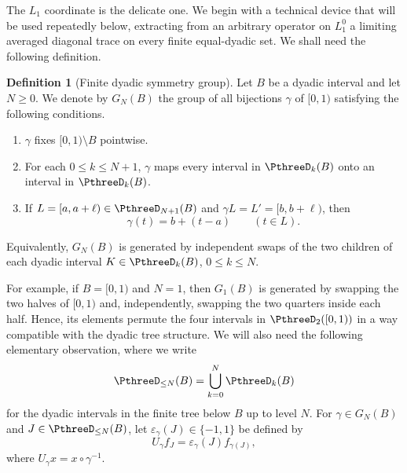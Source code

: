 \documentclass[11pt,reqno]{amsart}
\makeatletter
\theoremstyle{plain}
\theoremstyle{definition}
\newtheorem{definition}[definition]{Definition}
\newcounter{problempaper}
\newenvironment{problempaperbody}{%
  \setcounter{subsection}{0}%
  \setcounter{subsubsection}{0}%
  \setcounter{paragraph}{0}%
  \renewcommand{\thesubsection}{\arabic{subsection}}%
  \renewcommand{\thesubsubsection}{\thesubsection.\arabic{subsubsection}}%
  \renewcommand{\theparagraph}{\thesubsubsection.\arabic{paragraph}}%
  \let\problem@outersection\section
  \let\problem@outersubsection\subsection
  \let\problem@outersubsubsection\subsubsection
  \let\problem@outerparagraph\paragraph
  \let\section\problem@papersection
  \let\subsection\problem@papersubsection
  \let\subsubsection\problem@papersubsubsection
}{%
  \let\section\problem@outersection
  \let\subsection\problem@outersubsection
  \let\subsubsection\problem@outersubsubsection
  \let\paragraph\problem@outerparagraph
}
\newcommand{\problem@target}[2]{%
  \hypertarget{problem-\theproblempaper-#1-#2}{}%
}
\newcommand{\problem@paperheading}[3]{%
  \par\bigskip
  \problem@target{#1}{#2}%
  \noindent{\large\bfseries #2.\quad #3\par}%
  \nobreak\smallskip
}
\newcommand{\problem@papersubheading}[3]{%
  \par\medskip
  \problem@target{#1}{#2}%
  \noindent{\normalsize\bfseries #2.\quad #3\par}%
  \nobreak\smallskip
}
\newcommand{\problem@papersubsubheading}[3]{%
  \par\smallskip
  \problem@target{#1}{#2}%
  \noindent{\normalsize\itshape #2.\quad #3.\ }%
}
\def\problem@papersection{%
  \@ifstar{\problem@papersectionstar}{\problem@papersectionnostar}%
}
\def\problem@papersectionstar#1{%
  \par\bigskip\noindent{\large\bfseries #1\par}\nobreak\smallskip
}
\def\problem@papersectionnostar#1{%
  \refstepcounter{subsection}%
  \setcounter{subsubsection}{0}%
  \setcounter{paragraph}{0}%
  \problem@paperheading{section}{\thesubsection}{#1}%
  \problem@writecontentsline{section}{\thesubsection}{#1}%
}
\def\problem@papersubsection{%
  \@ifstar{\problem@papersubsectionstar}{\problem@papersubsectionnostar}%
}
\def\problem@papersubsectionstar#1{%
  \par\medskip\noindent{\normalsize\bfseries #1\par}\nobreak\smallskip
}
\def\problem@papersubsectionnostar#1{%
  \refstepcounter{subsubsection}%
  \setcounter{paragraph}{0}%
  \problem@papersubheading{subsection}{\thesubsubsection}{#1}%
  \problem@writecontentsline{subsection}{\thesubsubsection}{#1}%
}
\def\problem@papersubsubsection{%
  \@ifstar{\problem@papersubsubsectionstar}{\problem@papersubsubsectionnostar}%
}
\def\problem@papersubsubsectionstar#1{%
  \par\smallskip\noindent{\normalsize\itshape #1.\ }%
}
\def\problem@papersubsubsectionnostar#1{%
  \refstepcounter{paragraph}%
  \problem@papersubsubheading{subsubsection}{\theparagraph}{#1}%
  \problem@writecontentsline{subsubsection}{\theparagraph}{#1}%
}
\newcommand{\problem@writecontentsline}[3]{%
  \begingroup
  \protected@write\@auxout{}{%
    \string\problemcontentsentry{\theproblempaper}{#1}{#2}{#3}{\thepage}%
  }%
  \endgroup
}
\newcommand{\problemcontentsentry}[5]{%
  \@ifundefined{problemcontents@#1}{%
    \expandafter\gdef\csname problemcontents@#1\endcsname{}%
  }{}%
  \expandafter\g@addto@macro\csname problemcontents@#1\endcsname{%
    \problemcontentsline{#1}{#2}{#3}{#4}{#5}%
  }%
}
\newcommand{\problemcontentslink}[4]{%
  \hyperlink{problem-#1-#2-#3}{#4}%
}
\newcommand{\problemcontentsline}[5]{%
  \ifstrequal{#2}{section}{%
    \par\noindent
    \problemcontentslink{#1}{#2}{#3}{\makebox[2.5em][l]{#3}#4}%
    \nobreak\dotfill
    \problemcontentslink{#1}{#2}{#3}{#5}\par
  }{%
    \ifstrequal{#2}{subsection}{%
      \par\noindent\hspace*{1.5em}%
      \problemcontentslink{#1}{#2}{#3}{\makebox[3.5em][l]{#3}#4}%
      \nobreak\dotfill
      \problemcontentslink{#1}{#2}{#3}{#5}\par
    }{%
      \par\noindent\hspace*{3em}%
      \problemcontentslink{#1}{#2}{#3}{\makebox[4.5em][l]{#3}#4}%
      \nobreak\dotfill
      \problemcontentslink{#1}{#2}{#3}{#5}\par
    }%
  }%
}
\makeatother
\begin{document}
\begin{problempaperbody}
The $L_1$ coordinate is the delicate one. We begin with a technical device that will be used repeatedly below, extracting from an arbitrary operator on $L_1^0$ a limiting averaged diagonal trace on every finite equal-dyadic set. We shall need the following definition.

\begin{definition}[Finite dyadic symmetry group]\label{p3:def:finite-dyadic-symmetry-group}
    Let $B$ be a dyadic interval and let $N\geq 0$. We denote by $G_N(B)$ the group of all bijections $\gamma$ of $[0,1)$ satisfying the following conditions.
    \begin{enumerate}[label=\textup{(\roman*)}]
        \item \label{p3:item:dyadic-symmetry-outside} $\gamma$ fixes $[0,1)\setminus B$ pointwise.
        \item \label{p3:item:dyadic-symmetry-levels} For each $0\leq k\leq N+1$, $\gamma$ maps every interval in $\PthreeD_k(B)$ onto an interval in $\PthreeD_k(B)$.
    \item \label{p3:item:dyadic-symmetry-terminal} If $L=[a,a+\ell)\in\PthreeD_{N+1}(B)$ and $\gamma L=L'=[b,b+\ell)$, then
    \begin{equation*}
            \gamma(t)=b+(t-a)\qquad (t\in L).
    \end{equation*}
    \end{enumerate}
    Equivalently, $G_N(B)$ is generated by independent swaps of the two children of each dyadic interval $K\in\PthreeD_k(B)$, $0\leq k\leq N$.
\end{definition}

For example, if $B=[0,1)$ and $N=1$, then $G_1(B)$ is generated by swapping the two halves of $[0,1)$ and, independently, swapping the two quarters inside each half. Hence, its elements permute the four intervals in $\PthreeD_2([0,1))$ in a way compatible with the dyadic tree structure. We will also need the following elementary observation, where we write
\begin{equation*}
        \PthreeD_{\leq N}(B)=\bigcup_{k=0}^N\PthreeD_k(B)
\end{equation*}
for the dyadic intervals in the finite tree below $B$ up to level $N$. For $\gamma\in G_N(B)$ and $J\in\PthreeD_{\leq N}(B)$, let $\varepsilon_\gamma(J)\in\{-1,1\}$ be defined by
\begin{equation*}
        U_\gamma f_J=\varepsilon_\gamma(J)f_{\gamma(J)},
\end{equation*}
where $U_\gamma x=x\circ\gamma^{-1}$.



\end{problempaperbody}
\end{document}
